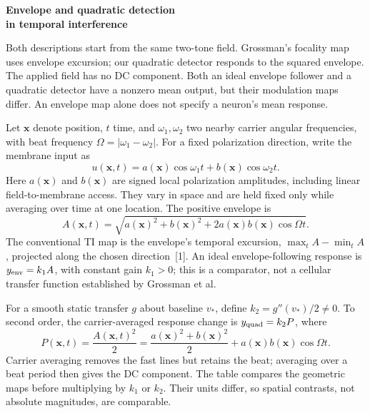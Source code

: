 \documentclass[11pt,a4paper]{article}
\newcommand{\xx}{\mathbf{x}}
\newcommand{\head}[1]{\par\vspace{4pt}{\large\bfseries #1}\par\vspace{2pt}}
\begin{document}
{\LARGE\bfseries Envelope and quadratic detection\\in temporal interference}\par
\vspace{3pt}
Both descriptions start from the same two-tone field. Grossman's focality map uses
envelope excursion; our quadratic detector responds to the squared envelope.
The applied field has no DC component. Both an ideal
envelope follower and a quadratic detector have a nonzero mean output, but their
modulation maps differ. An envelope map alone does not specify a neuron's mean response.

\head{The amplitudes are spatial fields}
Let $\xx$ denote position, $t$ time, and $\omega_1,\omega_2$ two nearby carrier angular
frequencies, with beat frequency $\Omega=|\omega_1-\omega_2|$. For a fixed polarization
direction, write the membrane input as
\begin{equation}
u(\xx,t)=a(\xx)\cos\omega_1t+b(\xx)\cos\omega_2t .
\label{eq:input}
\end{equation}
Here $a(\xx)$ and $b(\xx)$ are signed local polarization amplitudes, including linear
field-to-membrane access. They vary in space and are held fixed only while averaging
over time at one location. The positive envelope is
\begin{equation}
A(\xx,t)=\sqrt{a(\xx)^2+b(\xx)^2+2a(\xx)b(\xx)\cos\Omega t}.
\label{eq:envelope}
\end{equation}
The conventional TI map is the envelope's temporal excursion, $\max_t A-\min_t A$,
projected along the chosen direction~[1]. An ideal envelope-following response is
$y_{\rm env}=k_1 A$, with constant gain $k_1>0$; this is a comparator, not a cellular
transfer function established by Grossman et al.

\head{The detector sets the mean and modulation maps}
For a smooth static transfer $g$ about baseline $v_*$, define
$k_2=g''(v_*)/2\ne0$. To second order, the carrier-averaged response change is
$y_{\rm quad}=k_2 P$, where
\begin{equation}
P(\xx,t)=\frac{A(\xx,t)^2}{2}
=\frac{a(\xx)^2+b(\xx)^2}{2}+a(\xx)b(\xx)\cos\Omega t .
\label{eq:power}
\end{equation}
Carrier averaging removes the fast lines but retains the beat; averaging over a
beat period then gives the DC component. The table compares the geometric maps
before multiplying by $k_1$ or $k_2$. Their units differ, so spatial contrasts,
not absolute magnitudes, are comparable.
\end{document}
